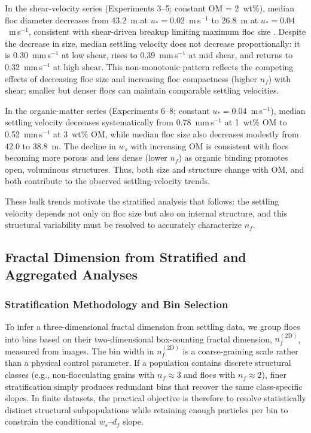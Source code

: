 \documentclass{agujournal2019}
\begin{document}
In the shear-velocity series (Experiments 3--5; constant OM = 2~wt\%), median floc diameter decreases from 43.2~\textmu m at $u_* = 0.02$~m\,s$^{-1}$ to 26.8~\textmu m at $u_* = 0.04$~m\,s$^{-1}$, consistent with shear-driven breakup limiting maximum floc size \cite{winterwerp2002flocculation}. Despite the decrease in size, median settling velocity does not decrease proportionally: it is 0.30~mm\,s$^{-1}$ at low shear, rises to 0.39~mm\,s$^{-1}$ at mid shear, and returns to 0.32~mm\,s$^{-1}$ at high shear. This non-monotonic pattern reflects the competing effects of decreasing floc size and increasing floc compactness (higher $n_f$) with shear; smaller but denser flocs can maintain comparable settling velocities.

In the organic-matter series (Experiments 6--8; constant $u_* = 0.04$~m\,s$^{-1}$), median settling velocity decreases systematically from 0.78~mm\,s$^{-1}$ at 1~wt\% OM to 0.52~mm\,s$^{-1}$ at 3~wt\% OM, while median floc size also decreases modestly from 42.0 to 38.8~\textmu m. The decline in $w_s$ with increasing OM is consistent with flocs becoming more porous and less dense (lower $n_f$) as organic binding promotes open, voluminous structures. Thus, both size and structure change with OM, and both contribute to the observed settling-velocity trends.

These bulk trends motivate the stratified analysis that follows: the settling velocity depends not only on floc size but also on internal structure, and this structural variability must be resolved to accurately characterize $n_f$.

\subsection{Fractal Dimension from Stratified and Aggregated Analyses}

\subsubsection{Stratification Methodology and Bin Selection}

To infer a three-dimensional fractal dimension from settling data, we group flocs into bins based on their two-dimensional box-counting fractal dimension, $n_f^{(2\mathrm{D})}$, measured from images. The bin width in $n_f^{(2\mathrm{D})}$ is a coarse-graining scale rather than a physical control parameter. If a population contains discrete structural classes (e.g., non-flocculating grains with $n_f \approx 3$ and flocs with $n_f \approx 2$), finer stratification simply produces redundant bins that recover the same class-specific slopes. In finite datasets, the practical objective is therefore to resolve statistically distinct structural subpopulations while retaining enough particles per bin to constrain the conditional $w_s$--$d_f$ slope.
\end{document}
